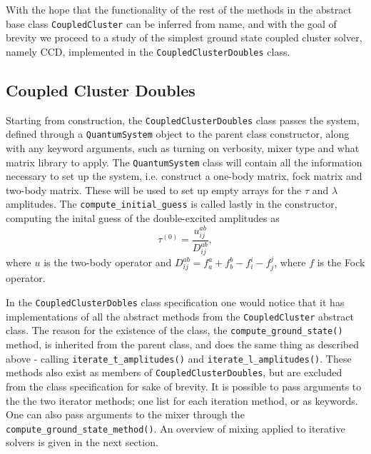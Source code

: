     With the hope that the functionality of the rest of the methods 
    in the abstract base class \lstinline{CoupledCluster} can be inferred from 
    name, and with the goal of brevity we proceed to a study of the simplest 
    ground state coupled cluster solver, namely CCD, implemented in the 
    \lstinline{CoupledClusterDoubles} class. 

    \subsection{Coupled Cluster Doubles}

    \begin{figure}
    
    \end{figure}
    
    Starting from construction, the \lstinline{CoupledClusterDoubles} class passes 
    the system, defined through a \lstinline{QuantumSystem} object to the 
    parent class constructor, along with any keyword arguments, such as turning 
    on verbosity, mixer type and what matrix library to apply. The
    \lstinline{QuantumSystem} class will contain all the information necessary to 
    set up the system, i.e. construct a one-body matrix, fock matrix and two-body 
    matrix. These will be used to set up empty arrays for the $\tau$ and $\lambda$ 
    amplitudes. The \lstinline{compute_initial_guess} is called lastly in the 
    constructor, computing the inital guess of the double-excited amplitudes as 
    \begin{equation}
        \label{eq:ccd_inital_guess}
        \tau^{(0)} = \frac{u^{ab}_{ij}}{D^{ab}_{ij}},
    \end{equation}
    where $u$ is the two-body operator and
    $D^{ab}_{ij} = f^a_a + f^b_b - f^i_i - f^j_j$,
    where $f$ is the Fock operator.
    
    In the \lstinline{CoupledClusterDobles} class specification one would
    notice that it has implementations of all the abstract methods 
    from the \lstinline{CoupledCluster} abstract class. The reason for the existence 
    of the class, the \lstinline{compute_ground_state()} method, is inherited from the 
    parent class, and does the same thing as described above - calling 
    \lstinline{iterate_t_amplitudes()} and \lstinline{iterate_l_amplitudes()}. These 
    methods also exist as members of \lstinline{CoupledClusterDoubles}, but are excluded 
    from the class specification for sake of brevity. It is 
    possible to pass arguments to the the two iterator methods; one list for each iteration
    method, or as keywords.
    One can also pass arguments 
    to the mixer through the \lstinline{compute_ground_state_method()}. 
    An overview of mixing applied to iterative solvers is given in the next 
    section.

